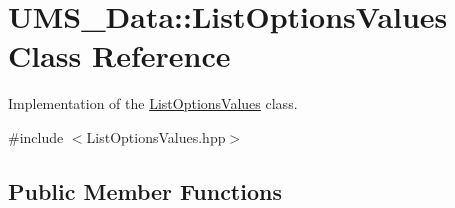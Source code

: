\hypertarget{classUMS__Data_1_1ListOptionsValues}{
\section{UMS\_\-Data::ListOptionsValues Class Reference}
\label{classUMS__Data_1_1ListOptionsValues}
}


Implementation of the \hyperlink{classUMS__Data_1_1ListOptionsValues}{ListOptionsValues} class.  




{\ttfamily \#include $<$ListOptionsValues.hpp$>$}

\subsection*{Public Member Functions}
